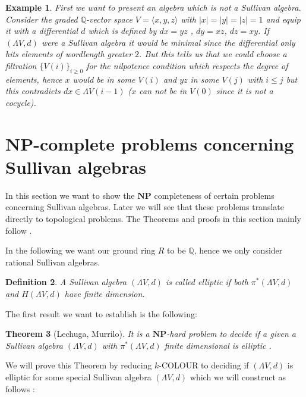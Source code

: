 \documentclass[12pt,a4paper]{scrartcl}
\newtheorem{Theorem}{Theorem}[section]
\newtheorem{Definition}[Theorem]{Definition}
\newtheorem{Example}[Theorem]{Example}
\numberwithin{equation}{section}
\newcommand{\Q}{\mathbb{Q}} %
\newcommand{\NPcomplexity}{\mathbf{NP}}
\newcommand{\Sullivan}{(\Lambda V,d)}
\begin{document}
\begin{Example}
 First we want to present an algebra which is not a Sullivan algebra. 
 Consider the graded $\Q$-vector space $V = \langle x,y,z \rangle$ with $|x| = |y| = |z| = 1$ and 
 equip it with a differential $d$ which is defined by $dx = yz$ , $dy = xz$, $dz = xy$. \newline
 If $\Sullivan$ were a Sullivan algebra it would be minimal since 
 the differential only hits elements of wordlength greater $2$. But this tells us that we could choose a filtration 
 ${\lbrace V(i) \rbrace}_{i \geq 0}$ for
 the nilpotence condition which respects the degree of elements, hence $ x $ would be in some $V(i)$ and $yz$ in some $V(j)$
 with $i \leq j$ but this contradicts $dx \in \Lambda V(i-1)$ ($x$ can not be in $V(0)$ since it is not a cocycle).
 
 
\end{Example}

 \section{NP-complete problems concerning Sullivan algebras}
 
 In this section we want to show the 
 $\NPcomplexity$ completeness of certain problems concerning Sullivan algebras. Later we will see that these problems
 translate directly to topological problems. The Theorems and proofs in this section mainly follow  \cite{Lechuga2000}.
 
 In the following we want our ground ring $R$ to be  $\Q$, hence we only consider rational Sullivan algebras.
 
 \begin{Definition}
  A Sullivan algebra $(\Lambda V, d)$ is called \emph{elliptic} if both $\pi^*(\Lambda V,d)$ and $H(\Lambda V,d)$ have
  finite dimension.
 \end{Definition}
 
 The first result we want to establish is the following:
 
 \begin{Theorem}[Lechuga, Murrilo]
 \label{cohomologyFinTheorem}
  It is a $\NPcomplexity$-hard problem to decide if a given a Sullivan algebra $(\Lambda V,d)$ with $\pi^*(\Lambda V,d)$ finite dimensional 
  is elliptic . 
 \end{Theorem}
 
 
 We will prove this Theorem by reducing $k$-COLOUR to deciding if $(\Lambda V,d)$ is elliptic for some special 
 Sullivan algebra $(\Lambda V,d)$ which we will construct as follows : \\
 
\end{document}
